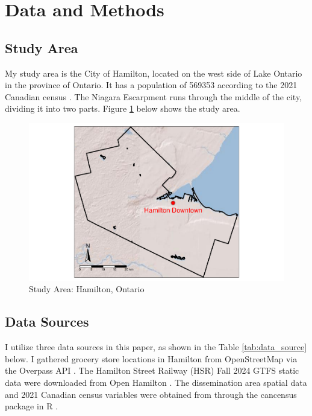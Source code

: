 \documentclass[preprint, 3p,
authoryear]{elsarticle} %
\begin{document}
\section{Data and Methods}\label{data-and-methods}

\subsection{Study Area}\label{study-area}

My study area is the City of Hamilton, located on the west side of Lake
Ontario in the province of Ontario. It has a population of 569353
according to the 2021 Canadian census \citep{census}. The Niagara
Escarpment runs through the middle of the city, dividing it into two
parts. Figure \ref{fig:study_area} below shows the study area.

\begin{figure}
\centering
\includegraphics{grocery_store_hamilton_files/figure-latex/unnamed-chunk-4-1.pdf}
\caption{\label{fig:study_area}Study Area: Hamilton, Ontario}
\end{figure}

\subsection{Data Sources}\label{data-sources}

I utilize three data sources in this paper, as shown in the Table
\ref{tab:data_source} below. I gathered grocery store locations in
Hamilton from OpenStreetMap \citep{osm} via the Overpass API
\citep{overpass}. The Hamilton Street Railway (HSR) Fall 2024 GTFS
static data were downloaded from Open Hamilton \citep{hsr_gtfs}. The
dissemination area spatial data and 2021 Canadian census variables were
obtained from \citet{census} through the cancensus package in R
\citep{cancensus}.
\end{document}
